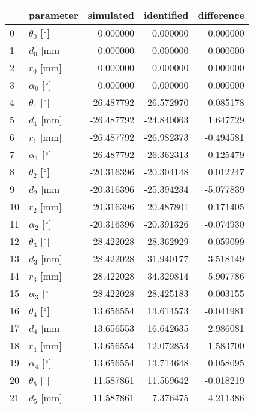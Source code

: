 \documentclass{standalone}%
\begin{document}
%
\normalsize%
\begin{tabular}{llrrr}
\toprule
{} &                 parameter &  simulated & identified & difference \\
\midrule
0  &  $\theta_{0}$ [$\degree$] &   0.000000 &   0.000000 &   0.000000 \\
1  &              $d_{0}$ [mm] &   0.000000 &   0.000000 &   0.000000 \\
2  &              $r_{0}$ [mm] &   0.000000 &   0.000000 &   0.000000 \\
3  &  $\alpha_{0}$ [$\degree$] &   0.000000 &   0.000000 &   0.000000 \\
4  &  $\theta_{1}$ [$\degree$] & -26.487792 & -26.572970 &  -0.085178 \\
5  &              $d_{1}$ [mm] & -26.487792 & -24.840063 &   1.647729 \\
6  &              $r_{1}$ [mm] & -26.487792 & -26.982373 &  -0.494581 \\
7  &  $\alpha_{1}$ [$\degree$] & -26.487792 & -26.362313 &   0.125479 \\
8  &  $\theta_{2}$ [$\degree$] & -20.316396 & -20.304148 &   0.012247 \\
9  &              $d_{2}$ [mm] & -20.316396 & -25.394234 &  -5.077839 \\
10 &              $r_{2}$ [mm] & -20.316396 & -20.487801 &  -0.171405 \\
11 &  $\alpha_{2}$ [$\degree$] & -20.316396 & -20.391326 &  -0.074930 \\
12 &  $\theta_{3}$ [$\degree$] &  28.422028 &  28.362929 &  -0.059099 \\
13 &              $d_{3}$ [mm] &  28.422028 &  31.940177 &   3.518149 \\
14 &              $r_{3}$ [mm] &  28.422028 &  34.329814 &   5.907786 \\
15 &  $\alpha_{3}$ [$\degree$] &  28.422028 &  28.425183 &   0.003155 \\
16 &  $\theta_{4}$ [$\degree$] &  13.656554 &  13.614573 &  -0.041981 \\
17 &              $d_{4}$ [mm] &  13.656553 &  16.642635 &   2.986081 \\
18 &              $r_{4}$ [mm] &  13.656554 &  12.072853 &  -1.583700 \\
19 &  $\alpha_{4}$ [$\degree$] &  13.656554 &  13.714648 &   0.058095 \\
20 &  $\theta_{5}$ [$\degree$] &  11.587861 &  11.569642 &  -0.018219 \\
21 &              $d_{5}$ [mm] &  11.587861 &   7.376475 &  -4.211386 \\

\end{tabular}
\end{document}

